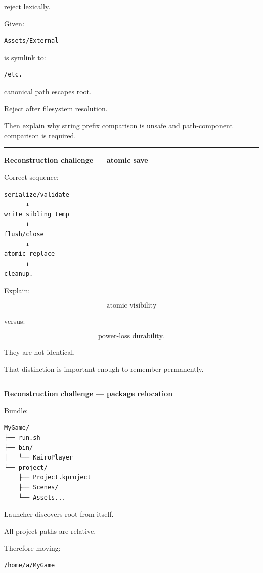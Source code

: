 reject lexically.

Given:

\begin{verbatim}
Assets/External
\end{verbatim}

is symlink to:

\begin{verbatim}
/etc.
\end{verbatim}

canonical path escapes root.

Reject after filesystem resolution.

Then explain why string prefix comparison is unsafe and path-component comparison is required.

\begin{center}\rule{0.5\linewidth}{0.5pt}\end{center}

\textbf{Reconstruction challenge --- atomic save}

Correct sequence:

\begin{verbatim}
serialize/validate
      ↓
write sibling temp
      ↓
flush/close
      ↓
atomic replace
      ↓
cleanup.
\end{verbatim}

Explain:

\[
\text{atomic visibility}
\]

versus:

\[
\text{power-loss durability}.
\]

They are not identical.

That distinction is important enough to remember permanently.

\begin{center}\rule{0.5\linewidth}{0.5pt}\end{center}

\textbf{Reconstruction challenge --- package relocation}

Bundle:

\begin{verbatim}
MyGame/
├── run.sh
├── bin/
│   └── KairoPlayer
└── project/
    ├── Project.kproject
    ├── Scenes/
    └── Assets...
\end{verbatim}

Launcher discovers root from itself.

All project paths are relative.

Therefore moving:

\begin{verbatim}
/home/a/MyGame
\end{verbatim}

